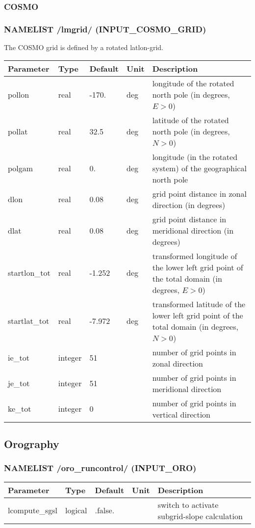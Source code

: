 \documentclass[a4paper,10pt,DIV14,BCOR1cm,titlepage,twoside]{scrartcl}
\providecommand{\tabularnewline}{\\}
\begin{document}
\subsubsection{COSMO}\label{namelist_input_for_extpar_grid_def_cosmo}
\subsubsection*{NAMELIST /lmgrid/ (INPUT\_COSMO\_GRID) }
The COSMO grid is defined by a rotated latlon-grid.
\begin{longtable}{|p{4cm}|p{1.5cm}|p{1.5cm}|p{1cm}|p{6cm}|}
\hline 
\textbf{Parameter}& \textbf{Type}&\textbf{Default}& \textbf{Unit}& \textbf{Description}
\tabularnewline
\hline
\endhead
\hline 
pollon & real & -170. & deg &  longitude of the rotated north pole (in degrees, $E>0$) \tabularnewline
\hline 
pollat & real & 32.5 & deg & latitude of the rotated north pole (in degrees, $N>0$) \tabularnewline
\hline 
polgam & real & 0. & deg &   longitude (in the rotated system) of the geographical north pole \tabularnewline
\hline 
dlon & real & 0.08 & deg &   grid point distance in zonal direction (in degrees) \tabularnewline
\hline 
dlat & real & 0.08 & deg &   grid point distance in meridional direction (in degrees) \tabularnewline
\hline 
startlon\_tot & real & -1.252 & deg &   transformed longitude of the lower left grid point of the total domain (in degrees, $E>0$) \tabularnewline
\hline 
startlat\_tot & real &   -7.972& deg &   transformed latitude of the lower left grid point of the total domain (in degrees, $N>0$) \tabularnewline
\hline 
ie\_tot & integer & 51 &  &  number of grid points in zonal direction \tabularnewline
\hline 
je\_tot & integer & 51 &  &   number of grid points in meridional direction \tabularnewline
\hline 
ke\_tot & integer & 0 &  &   number of grid points in vertical direction \tabularnewline
\hline
\bottomrule
\end{longtable}

\subsection{Orography}\label{namelist_input_for_extpar_orography}

\subsubsection*{NAMELIST /oro\_runcontrol/ (INPUT\_ORO)}
\begin{longtable}{|p{4cm}|p{1.5cm}|p{1.5cm}|p{1cm}|p{6cm}|}
\hline 
\textbf{Parameter}& \textbf{Type}& \textbf{Default}& \textbf{Unit}& \textbf{Description}
\tabularnewline
\hline
\endhead
\hline 
lcompute\_sgsl & logical& .false.& & switch to activate subgrid-slope calculation
\tabularnewline
\hline
\bottomrule
\end{longtable}
\end{document}
